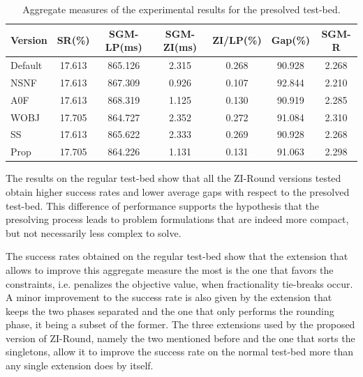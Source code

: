 \documentclass[a4paper,12pt,twoside]{scrbook}
\begin{document}
\begin{table}[ht]
	\centering
	\begin{tabular}{@{}lcccccc@{}}
	\toprule
	Version  & SR(\%) & SGM-LP(ms) & SGM-ZI(ms) & ZI/LP(\%) & Gap(\%) & SGM-R \\ \midrule
	Default  & 17.613 & 865.126    & 2.315      & 0.268     & 90.928  & 2.268 \\
	NSNF     & 17.613 & 867.309    & 0.926      & 0.107     & 92.844  & 2.210 \\
	A0F      & 17.613 & 868.319    & 1.125      & 0.130     & 90.919  & 2.285 \\
	WOBJ     & 17.705 & 864.727    & 2.352      & 0.272     & 91.084  & 2.310 \\
	SS       & 17.613 & 865.622    & 2.333      & 0.269     & 90.928  & 2.268 \\
	Prop     & 17.705 & 864.226    & 1.131      & 0.131     & 91.063  & 2.298 \\ \bottomrule
	\end{tabular}
	\caption{Aggregate measures of the experimental results for the presolved test-bed.}
	\label{tb:results-presolved}
\end{table}

The results on the regular test-bed show that all the ZI-Round versions tested obtain higher success rates and lower average gaps with respect to the presolved test-bed. This difference of performance supports the hypothesis that the presolving process leads to problem formulations that are indeed more compact, but not necessarily less complex to solve. \par

The success rates obtained on the regular test-bed show that the extension that allows to improve this aggregate measure the most is the one that favors the constraints, i.e. penalizes the objective value, when fractionality tie-breaks occur. A minor improvement to the success rate is also given by the extension that keeps the two phases separated and the one that only performs the rounding phase, it being a subset of the former.
The three extensions used by the proposed version of ZI-Round, namely the two mentioned before and the one that sorts the singletons, allow it to improve the success rate on the normal test-bed more than any single extension does by itself. \par 
\end{document}
